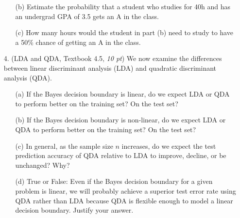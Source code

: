 \documentclass[10pt]{article}
\theoremstyle{definition}
\theoremstyle{remark}
\begin{document}
\begin{itemize}
\begin{itemize}
		\item [(b)] Estimate the probability that a student who studies for 40h and has an undergrad GPA of 3.5 gets an A in the class.
		
		\item [(c)] How many hours would the student in part (b) need to study to have a 50\% chance of getting an A in the class.
	\end{itemize}

	\item [4.] (LDA and QDA, Textbook 4.5, \textit{10 pt}) We now examine the differences between linear discriminant analysis (LDA) and quadratic discriminant analysis (QDA).
	\begin{itemize}
		\item [(a)] If the Bayes decision boundary is linear, do we expect LDA or QDA to perform better on the training set? On the test set?
		
		\item [(b)] If the Bayes decision boundary is non-linear, do we expect LDA or QDA to perform better on the training set? On the test set?
		
		\item [(c)] In general, as the sample size $ n $ increases, do we expect the test prediction accuracy of QDA relative to LDA to improve, decline, or be unchanged? Why?
		
		\item [(d)] True or False: Even if the Bayes decision boundary for a given problem is linear, we will probably achieve a superior test error rate using QDA rather than LDA because QDA is flexible enough to model a linear decision boundary. Justify your answer.
	\end{itemize}
\end{itemize}
	
\end{document}
